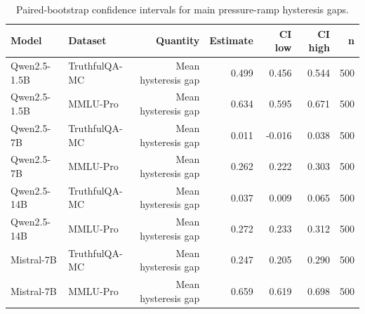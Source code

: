 \begin{table}[ht]
\centering
\caption{Paired-bootstrap confidence intervals for main pressure-ramp hysteresis gaps.}
\label{tab:bootstrap-main-pressure}
\begin{tabular}{llrrrrr}
\toprule
Model & Dataset & Quantity & Estimate & CI low & CI high & n \\
\midrule
Qwen2.5-1.5B & TruthfulQA-MC & Mean hysteresis gap & 0.499 & 0.456 & 0.544 & 500 \\
Qwen2.5-1.5B & MMLU-Pro & Mean hysteresis gap & 0.634 & 0.595 & 0.671 & 500 \\
Qwen2.5-7B & TruthfulQA-MC & Mean hysteresis gap & 0.011 & -0.016 & 0.038 & 500 \\
Qwen2.5-7B & MMLU-Pro & Mean hysteresis gap & 0.262 & 0.222 & 0.303 & 500 \\
Qwen2.5-14B & TruthfulQA-MC & Mean hysteresis gap & 0.037 & 0.009 & 0.065 & 500 \\
Qwen2.5-14B & MMLU-Pro & Mean hysteresis gap & 0.272 & 0.233 & 0.312 & 500 \\
Mistral-7B & TruthfulQA-MC & Mean hysteresis gap & 0.247 & 0.205 & 0.290 & 500 \\
Mistral-7B & MMLU-Pro & Mean hysteresis gap & 0.659 & 0.619 & 0.698 & 500 \\
\bottomrule
\end{tabular}
\end{table}
